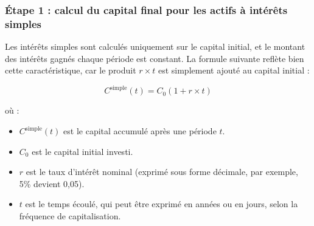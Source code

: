 \documentclass{article}
\begin{document}
\subsubsection*{Étape 1 : calcul du capital final pour les actifs à intérêts simples}

\begin{tcolorbox}[
        colback=lightgreen, 
        colframe=lightgreen, 
        boxrule=0.5pt, 
        arc=0pt, 
        left=10pt, 
        right=10pt, 
        top=6pt, 
        bottom=6pt, 
        boxsep=2pt, 
        before upper={\faLightbulb\hspace{10pt}}
    ]
        Les intérêts simples sont calculés uniquement sur le capital initial, et le montant des intérêts gagnés chaque période est constant. La formule suivante reflète bien cette caractéristique, car le produit \( r \times t \) est simplement ajouté au capital initial :

        \[
        C^{\text{simple}}(t) = C_0 \left(1 + r \times t\right)
        \]
        
        où :
        \begin{itemize}
            \item \( C^{\text{simple}}(t) \) est le capital accumulé après une période \( t \).
            \item \( C_0 \) est le capital initial investi.
            \item \( r \) est le taux d'intérêt nominal (exprimé sous forme décimale, par exemple, 5\% devient 0,05).
            \item \( t \) est le temps écoulé, qui peut être exprimé en années ou en jours, selon la fréquence de capitalisation.
        \end{itemize}
    \end{tcolorbox}
\end{document}
